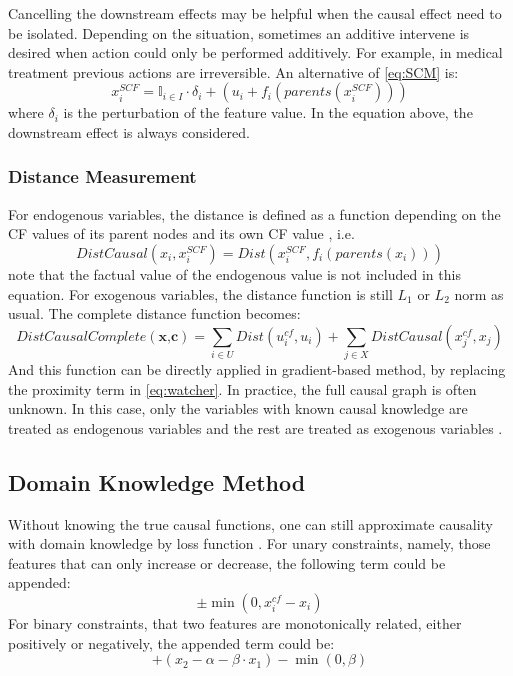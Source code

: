Cancelling the downstream effects may be helpful when the causal effect need to be isolated. Depending on the situation, sometimes an additive intervene is desired when action could only be performed additively. For example, in medical treatment previous actions are irreversible. An alternative of \autoref{eq:SCM} is:
\begin{equation}\label{eq:SCMsoft}
  x_i^{SCF}=\mathbb{I}_{i\in I}\cdot \delta_i+(u_i+f_i(parents(x_i^{SCF})))
\end{equation}
where $\delta_i$ is the perturbation of the feature value. In the equation above, the downstream effect is always considered.

\subsubsection{Distance Measurement} For endogenous variables, the distance is defined as a function depending on the CF values of its parent nodes and its own CF value \cite{preservingCausal}, i.e.
\begin{equation}\label{eq:CausalDist}
  DistCausal(x_i,x_i^{SCF})=Dist(x_i^{SCF},f_i(parents(x_i)))
\end{equation}
note that the factual value of the endogenous value is not included in this equation. For exogenous variables, the distance function is still $L_1$ or $L_2$ norm as usual. The complete distance function becomes:
\begin{equation}\label{eq:CausalDistComplete}
  DistCausalComplete(\textbf{x,c})=\sum_{i\in U}Dist(u_i^{cf},u_i)+\sum_{j\in X}DistCausal(x_j^{cf},x_j)
\end{equation}
And this function can be directly applied in gradient-based method, by replacing the proximity term in \autoref{eq:watcher}. In practice, the full causal graph is often unknown. In this case, only the variables with known causal knowledge are treated as endogenous variables and the rest are treated as exogenous variables \cite{preservingCausal}.

\subsection{Domain Knowledge Method}
Without knowing the true causal functions, one can still approximate causality with domain knowledge by loss function \cite{preservingCausal}. For unary constraints, namely, those features that can only increase or decrease, the following term could be appended:
\begin{equation}\label{eq:approxUnary}
  \pm \min(0,x_i^{cf}-x_i)
\end{equation}
For binary constraints, that two features are monotonically related, either positively or negatively, the appended term could be:
\begin{equation}\label{eq:approxBi}
  +(x_2-\alpha-\beta\cdot x_1)-\min(0,\beta)
\end{equation}
